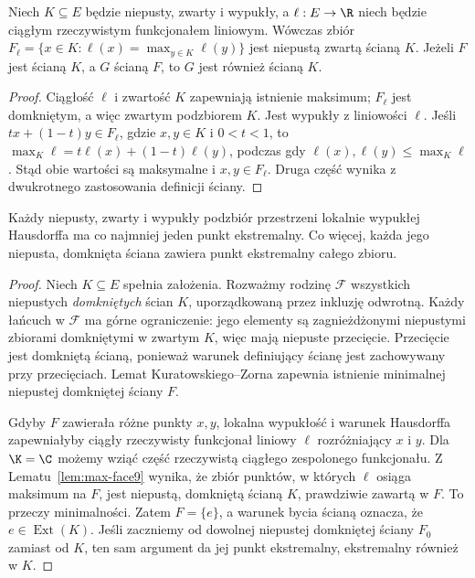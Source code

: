 \begin{lemat}
\label{lem:max-face9}
Niech $K\subseteq E$ będzie niepusty, zwarty i wypukły,
a $\ell:E\to\R$ niech będzie ciągłym rzeczywistym
funkcjonałem liniowym. Wówczas zbiór
$F_\ell=\{x\in K:\ell(x)=\max_{y\in K}\ell(y)\}$
jest niepustą zwartą ścianą $K$.
Jeżeli $F$ jest ścianą $K$, a $G$ ścianą $F$,
to $G$ jest również ścianą $K$.
\end{lemat}
\begin{proof}
Ciągłość $\ell$ i zwartość $K$ zapewniają istnienie maksimum;
$F_\ell$ jest domkniętym, a więc zwartym podzbiorem $K$.
Jest wypukły z liniowości $\ell$. Jeśli
$tx+(1-t)y\in F_\ell$, gdzie $x,y\in K$ i $0<t<1$, to
$\max_K\ell=t\ell(x)+(1-t)\ell(y)$, podczas gdy
$\ell(x),\ell(y)\le\max_K\ell$. Stąd obie wartości
są maksymalne i $x,y\in F_\ell$. Druga część wynika
z dwukrotnego zastosowania definicji ściany.
\end{proof}

\begin{lemat}
\label{lem:exist-extreme9}
Każdy niepusty, zwarty i wypukły podzbiór przestrzeni lokalnie
wypukłej Hausdorffa ma co najmniej jeden punkt ekstremalny.
Co więcej, każda jego niepusta, domknięta ściana zawiera
punkt ekstremalny całego zbioru.
\end{lemat}
\begin{proof}
Niech $K\subseteq E$ spełnia założenia. Rozważmy rodzinę
$\mathcal F$ wszystkich niepustych \emph{domkniętych} ścian $K$,
uporządkowaną przez inkluzję odwrotną.
Każdy łańcuch w $\mathcal F$ ma górne ograniczenie:
jego elementy są zagnieżdżonymi niepustymi zbiorami
domkniętymi w zwartym $K$, więc mają niepuste przecięcie.
Przecięcie jest domkniętą ścianą, ponieważ warunek definiujący
ścianę jest zachowywany przy przecięciach.
Lemat Kuratowskiego--Zorna zapewnia istnienie minimalnej
niepustej domkniętej ściany $F$.

Gdyby $F$ zawierała różne punkty $x,y$, lokalna wypukłość
i warunek Hausdorffa zapewniałyby ciągły rzeczywisty
funkcjonał liniowy $\ell$ rozróżniający $x$ i $y$.
Dla $\K=\C$ możemy wziąć część rzeczywistą ciągłego
zespolonego funkcjonału. Z Lematu~\ref{lem:max-face9}
wynika, że zbiór punktów, w których $\ell$ osiąga
maksimum na $F$, jest niepustą, domkniętą ścianą $K$,
prawdziwie zawartą w $F$. To przeczy minimalności.
Zatem $F=\{e\}$, a warunek bycia ścianą oznacza,
że $e\in\operatorname{Ext}(K)$.
Jeśli zaczniemy od dowolnej niepustej domkniętej ściany
$F_0$ zamiast od $K$, ten sam argument da jej punkt
ekstremalny, ekstremalny również w $K$.
\end{proof}

